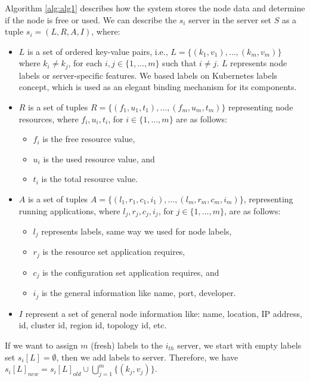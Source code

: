 Algorithm \ref{alg:alg1} describes how the system stores the node data and determine if the node is free or used.
We can describe the $s_i$ server in the server set $S$ as a tuple $s_i = (L, R, A, I)$, where:

\begin{itemize}
	\item $L$ is a set of ordered key-value pairs, i.e., $L = \{(k_1,v_1),\ldots ,(k_m,v_m)\}$ where $k_i \not= k_j$, for each $i,j\in \{1, \ldots , m\}$ such that $i\not= j$. $L$ represents node labels or server-specific features.  
	We based labels on Kubernetes  \cite{RossiCPN20} labels concept, which is used as an elegant binding mechanism for its components.
	\item $R$ is a set of tuples $R = \{(f_1,u_1,t_1),\ldots ,(f_m,u_m,t_m)\}$ representing node resources, where $f_i,u_i,t_i$, for $i\in\{1,\ldots,m\}$ are as follows:
	\begin{itemize}
		\item $f_i$ is the free resource value, 
		\item $u_i$ is the used resource value, and 
		\item $t_i$ is the total resource value. 
	\end{itemize}
	\item $A$ is a set of tuples $A = \{(l_1,r_1,c_1,i_1), \ldots ,(l_m,r_m,c_m,i_m)\}$, representing running applications, where $l_j,r_j,c_j,i_j$, for $j\in\{1,\ldots,m\}$, are as follows: 
	\begin{itemize}
		\item  $l_j$ represents labels, same way we used for node labels, 
		\item $r_j$ is the resource set application requires, 
		\item $c_j$ is the configuration set application requires, and 
		\item $i_j$ is the general information like name, port, developer. 
	\end{itemize}
	\item $I$ represent a set of general node information like: name, location, IP address, id, cluster id, region id, topology id, etc.
\end{itemize}

If we want to assign $m$ (fresh) labels to the $i_\mathit{th}$ server, 
we start with empty labels set $s_i[L]=\emptyset$, then we add labels to server. Therefore, we have $s_i[L]_\mathit{new} = s_i[L]_\mathit{old} \cup \bigcup%
_{j=1}^{m} \{(k_j,v_j)\}$.

